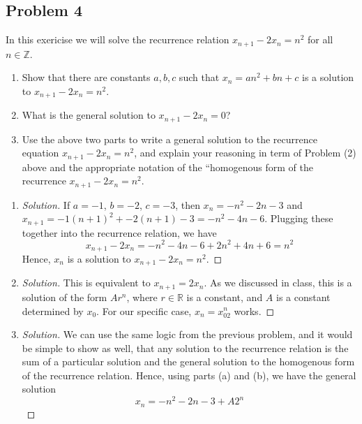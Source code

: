 \documentclass{article}
\newcommand{\Z}{{\mathbb Z}}
\newcommand{\R}{{\mathbb R}}
\begin{document}
\subsection*{Problem 4}
In this exericise we will solve the recurrence relation
$x_{n+1} - 2x_n = n^2$ for all $n \in \Z$.
\begin{enumerate}
	\item Show that there are constants $a,b,c$ such that $x_n = an^2 + bn + c$
		is a solution to $x_{n+1} - 2x_n = n^2$.
	\item What is the general solution to $x_{n+1} - 2x_n = 0$?
	\item Use the above two parts to write a general solution to
		the recurrence equation $x_{n+1} - 2x_n = n^2$,
		and explain your reasoning in term of Problem (2)
		above and the appropriate notation of the
		``homogenous form of the recurrence $x_{n+1} - 2x_n = n^2$.
\end{enumerate}

\begin{enumerate}
	\item \begin{proof}[Solution]\let\qed\relax
		If $a = -1$, $b = -2$, $c = -3$,
		then $x_n = -n^2 - 2n - 3$ and
		$x_{n+1} = -1(n+1)^2 + -2(n+1) - 3 = -n^2 -4n - 6$.
		Plugging these together into the recurrence relation, we have
		\[
			x_{n+1} - 2x_{n}
			= -n^2 - 4n - 6 + 2n^2 + 4n + 6 = n^2
		\]
		Hence, $x_n$ is a solution to $x_{n+1} - 2x_n = n^2$.
	\end{proof}
	\item \begin{proof}[Solution]\let\qed\relax
		This is equivalent to $x_{n+1} = 2x_n$.
		As we discussed in class, this is a solution of the form $Ar^n$,
		where $r \in \R$ is a constant, and $A$ is a constant determined by $x_0$.
		For our specific case, $x_n = x_02^n$ works.
	\end{proof}
	\item \begin{proof}[Solution]\let\qed\relax
		We can use the same logic from the previous problem,
		and it would be simple to show as well,
		that any solution to the recurrence relation
		is the sum of a particular solution and the general solution
		to the homogenous form of the recurrence relation.
		Hence, using parts (a) and (b), we have the general solution
		\[
			x_n = -n^2 - 2n - 3 + A2^n
		\]
	\end{proof}
\end{enumerate}
\end{document}
